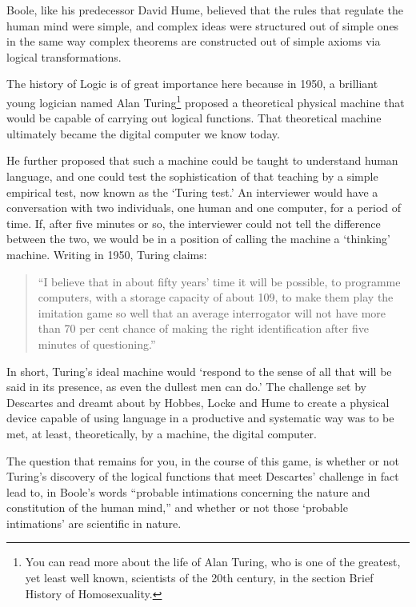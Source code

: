 \begin{refsection}
Boole, like his predecessor David Hume, believed that the rules that regulate the human mind were simple, and complex ideas were structured out of simple ones in the same way complex theorems are constructed out of simple axioms via logical transformations.

The history of Logic is of great importance here because in 1950, a brilliant young logician named Alan Turing\footnote{You can read more about the life of Alan Turing, who is one of the greatest, yet least well known, scientists of the 20th century, in the section Brief History of Homosexuality.} proposed a theoretical physical machine that would be capable of carrying out logical functions. That theoretical machine ultimately became the digital computer we know today.

He further proposed that such a machine could be taught to understand human language, and one could test the sophistication of that teaching by a simple empirical test, now known as the `Turing test.' An interviewer would have a conversation with two individuals, one human and one computer, for a period of time. If, after five minutes or so, the interviewer could not tell the difference between the two, we would be in a position of calling the machine a `thinking' machine. Writing in 1950, Turing claims:

\begin{quote}

``I believe that in about fifty years' time it will be possible, to programme computers, with a storage capacity of about 109, to make them play the imitation game so well that an average interrogator will not have more than 70 per cent chance of making the right identification after five minutes of questioning.''
\end{quote}

In short, Turing's ideal machine would `respond to the sense of all that will be said in its presence, as even the dullest men can do.' The challenge set by Descartes and dreamt about by Hobbes, Locke and Hume to create a physical device capable of using language in a productive and systematic way was to be met, at least, theoretically, by a machine, the digital computer.

The question that remains for you, in the course of this game, is whether or not Turing's discovery of the logical functions that meet Descartes' challenge in fact lead to, in Boole's words ``probable intimations concerning the nature and constitution of the human mind,'' and whether or not those `probable intimations' are scientific in nature.


\end{refsection}

